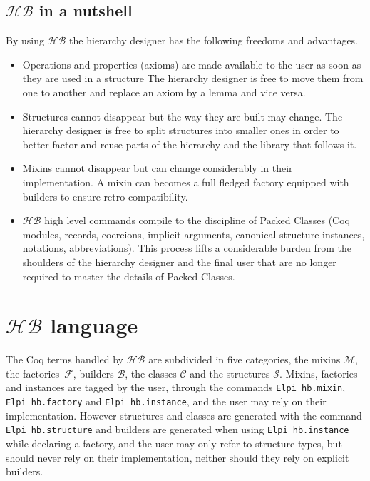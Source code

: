 \documentclass[a4paper,UKenglish,cleveref, autoref]{lipics-v2019}
\newcommand{\HB}{\ensuremath{\mathcal{HB}}}
\newcommand{\mixin}{mixin}
\newcommand{\mixins}{mixins}
\newcommand{\Mixins}{Mixins}
\newcommand{\M}{\ensuremath{\mathcal{M}}}
\newcommand{\factory}{factory}
\newcommand{\factories}{factories}
\newcommand{\phantterms}{abbreviations}
\newcommand{\builder}{builder}
\newcommand{\mixinbuilders}{builders}
\newcommand{\F}{\ensuremath{\mathcal{F}}}
\newcommand{\C}{\ensuremath{\mathcal{C}}}
\newcommand{\B}{\ensuremath{\mathcal{B}}}
\newcommand{\classes}{classes}
\newcommand{\Str}{\ensuremath{\mathcal{S}}}
\newcommand{\structures}{structures}
\newcommand{\hbmixin}{{\tt\color{dkgreen}Elpi hb.mixin}}
\newcommand{\hbfactory}{{\tt\color{dkgreen}Elpi hb.factory}}
\newcommand{\hbinstance}{{\tt\color{dkgreen}Elpi hb.instance}}
\newcommand{\hbstructure}{{\tt\color{dkgreen}Elpi hb.structure}}
\theoremstyle{implem}
\theoremstyle{implem}
\theoremstyle{command}
\begin{document}
\subsection{\HB{} in a nutshell}

By using \HB{} the hierarchy designer has the following freedoms and advantages.

\begin{itemize}
\item Operations and properties (axioms) are made available to the user
      as soon as they are used in a structure The hierarchy designer
      is free to move them from one to another and replace an axiom
      by a lemma and vice versa.
\item Structures cannot disappear but the way they are built may change.
      The hierarchy designer is free to split structures into smaller
      ones in order to better factor and reuse parts of the hierarchy
      and the library that follows it.
\item \Mixins{} cannot disappear but can change considerably
      in their implementation. A \mixin{} can becomes a full fledged
      \factory{} equipped with \builder{}s to ensure retro compatibility.
\item \HB{} high level commands compile to
      the discipline of Packed Classes (Coq modules, records, coercions,
      implicit arguments, canonical structure instances, notations,
      \phantterms{}).
      This process lifts a considerable
      burden from the shoulders of the hierarchy designer and the final user
      that are no longer required to master the details of Packed Classes.
\end{itemize}

\section{\HB{} language}\label{sec:language}

The Coq terms handled by \HB{} are subdivided in five categories, the
\mixins{} \(\M{}\), the \factories{}~\(\F{}\), \mixinbuilders{}
\(\B{}\), the \classes{} \(\C{}\) and the \structures{}
\(\Str{}\). \Mixins{}, \factories{} and instances are tagged by the
user, through the commands \hbmixin{}, \hbfactory{} and \hbinstance{},
and the user may rely on their implementation. However structures and
classes are generated with the command \hbstructure{} and builders are
generated when using \hbinstance{} while declaring a \factory{}, and
the user may only refer to structure types, but should never rely on
their implementation, neither should they rely on explicit builders.
\end{document}

